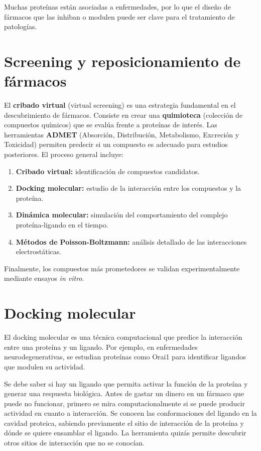 Muchas proteínas están asociadas a enfermedades, por lo que el diseño de fármacos que las inhiban o modulen puede ser clave para el tratamiento de patologías.

\section{Screening y reposicionamiento de fármacos}
El \textbf{cribado virtual} (virtual screening) es una estrategia fundamental en el descubrimiento de fármacos. Consiste en crear una \textbf{quimioteca} (colección de compuestos químicos) que se evalúa frente a proteínas de interés. Las herramientas \textbf{ADMET} (Absorción, Distribución, Metabolismo, Excreción y Toxicidad) permiten predecir si un compuesto es adecuado para estudios posteriores.
El proceso general incluye:
\begin{enumerate}
\item \textbf{Cribado virtual:} identificación de compuestos candidatos.
\item \textbf{Docking molecular:} estudio de la interacción entre los compuestos y la proteína.
\item \textbf{Dinámica molecular:} simulación del comportamiento del complejo proteína-ligando en el tiempo.
\item \textbf{Métodos de Poisson-Boltzmann:} análisis detallado de las interacciones electrostáticas.
\end{enumerate}
Finalmente, los compuestos más prometedores se validan experimentalmente mediante ensayos \textit{in vitro}.

\section{Docking molecular}
El docking molecular es una técnica computacional que predice la interacción entre una proteína y un ligando. Por ejemplo, en enfermedades neurodegenerativas, se estudian proteínas como Orai1 para identificar ligandos que modulen su actividad.

Se debe saber si hay un ligando que permita activar la función de la proteína y generar una respuesta biológica. Antes de gastar un dinero en un fármaco que puede no funcionar, primero se mira computacionalmente si se puede producir actividad en cuanto a interacción. Se conocen las conformaciones del ligando en la cavidad proteica, sabiendo previamente el sitio de interacción de la proteína y dónde se quiere ensamblar el ligando. La herramienta quizás permite descubrir otros sitios de interacción que no se conocían. 

